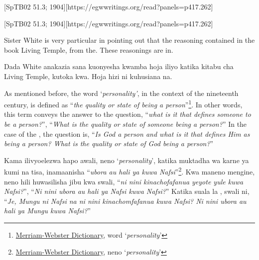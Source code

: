 [SpTB02 51.3; 1904][https://egwwritings.org/read?panels=p417.262]


[SpTB02 51.3; 1904][https://egwwritings.org/read?panels=p417.262]


Sister White is very particular in pointing out that the reasoning contained in the book Living Temple, from the. These reasonings are in.


Dada White anakazia sana kuonyesha kwamba hoja iliyo katika kitabu cha Living Temple, kutoka kwa. Hoja hizi ni kuhusiana na.


As mentioned before, the word ‘\textit{personality’}, in the context of the nineteenth century, is defined as “\textit{the quality or state of being a person}”\footnote{\href{https://www.merriam-webster.com/dictionary/personality}{Merriam-Webster Dictionary}, word ‘\textit{personality}’}. In other words, this term conveys the answer to the question, “\textit{what is it that defines someone to be a person?}”, “\textit{What is the quality or state of someone being a person?}” In the case of the , the question is, “\textit{Is God a person and what is it that defines Him as being a person? What is the quality or state of God being a person?}”


Kama ilivyoelezwa hapo awali, neno ‘\textit{personality}’, katika muktadha wa karne ya kumi na tisa, inamaanisha “\textit{ubora au hali ya kuwa Nafsi}”\footnote{\href{https://www.merriam-webster.com/dictionary/personality}{Merriam-Webster Dictionary}, neno ‘\textit{personality}’}. Kwa maneno mengine, neno hili huwasilisha jibu kwa swali, “\textit{ni nini kinachofafanua yeyote yule kuwa Nafsi?}”, “\textit{Ni nini ubora au hali ya Nafsi kuwa Nafsi?}” Katika suala la , swali ni, “\textit{Je, Mungu ni Nafsi na ni nini kinachomfafanua kuwa Nafsi? Ni nini ubora au hali ya Mungu kuwa Nafsi?}”


